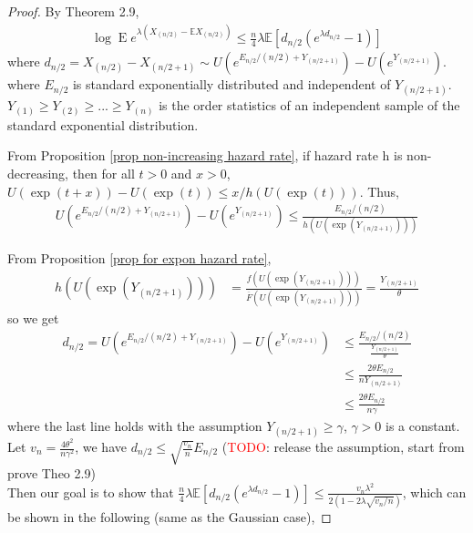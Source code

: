 \documentclass{article}
\theoremstyle{plain}
\begin{document}
\begin{proof}
By \cite{boucheron2012} Theorem 2.9, 
\begin{align}
    \log \operatorname{E} e^{\lambda\left(X_{(n / 2)}-\mathbb{E} X_{(n / 2)}\right)} \leq \frac{n}{4} \lambda \mathbb{E}\left[d_{n / 2}\left(e^{\lambda d_{n / 2}}-1\right)\right]
\end{align}
where $d_{n / 2}=X_{(n / 2)}-X_{(n / 2+1)} \sim U\left(e^{E_{n / 2} /(n / 2)+Y_{(n / 2+1)}} \right)-U\left(e^{Y_{(n / 2+1)}}\right).$ where $E_{n/2}$ is standard exponentially distributed and independent of $Y_{(n/2 + 1)}$. $Y_{(1)} \geq Y_{(2)} \geq ... \geq Y_{(n)}$ is the order statistics of an independent sample of the standard exponential distribution. 

From Proposition \ref{prop non-increasing hazard rate}, if hazard rate h is non-decreasing, then for all $t > 0$ and $x > 0$, $U(\exp (t+x))-U(\exp (t)) \leq x / h(U(\exp (t)))$. Thus, 
\begin{align}
    U\left(e^{E_{n / 2} /(n / 2)+Y_{(n / 2+1)}} \right)-U\left(e^{Y_{(n / 2+1)}}\right) \leq \frac{E_{n / 2} /(n / 2)}{h(U(\exp{(Y_{(n/2+1)})}))}
\end{align}

From Proposition \ref{prop for expon hazard rate}, 
\begin{align}
    h(U(\exp{(Y_{(n/2+1)})})) &= \frac{f(U(\exp (Y_{(n/2+1)})))}{\overline{F}({U}(\exp (Y_{(n/2+1)})))} = \frac{Y_{(n/2+1)}}{\theta} 
\end{align}
so we get 
\begin{align}
    d_{n/2} = U\left(e^{E_{n / 2} /(n / 2)+Y_{(n / 2+1)}} \right)-U\left(e^{Y_{(n / 2+1)}}\right) 
    &\leq \frac{E_{n / 2} /(n / 2)}{\frac{Y_{(n/2+1)}}{\theta} }\\
    &\leq \frac{ 2\theta E_{n / 2} }{n Y_{(n/2+1)}}\\
    & \leq \frac{ 2\theta E_{n / 2} }{n \gamma}
\end{align}
where the last line holds with the assumption $Y_{(n/2+1)} \geq \gamma$, $\gamma > 0$ is a constant. Let $v_n = \frac{4 \theta^2}{n \gamma^2}$, we have $d_{n/2} \leq \sqrt{\frac{v_n}{n}} E_{n/2}$ (\textcolor{red}{TODO}: release the assumption, start from prove Theo 2.9)\\

Then our goal is to show that $\frac{n}{4} \lambda \mathbb{E}\left[d_{n / 2}\left(e^{\lambda d_{n / 2}}-1\right)\right] \leq \frac{v_{n} \lambda^{2}}{2\left(1-2 \lambda \sqrt{v_{n} / n}\right)}$, which can be shown in the following (same as the Gaussian case),


\end{proof}
\end{document}

